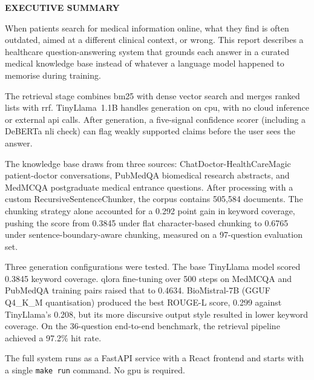 \begin{center}
	\Large{\textbf{EXECUTIVE SUMMARY}}
\end{center}
\vspace{1em}
\normalsize

When patients search for medical information online, what they find is often outdated, aimed at a different clinical context, or wrong. This report describes a healthcare question-answering system that grounds each answer in a curated medical knowledge base instead of whatever a language model happened to memorise during training.

The retrieval stage combines \ac{bm25} with dense vector search and merges ranked lists with \ac{rrf}. TinyLlama~1.1B handles generation on \ac{cpu}, with no cloud inference or external \ac{api} calls. After generation, a five-signal confidence scorer (including a DeBERTa \ac{nli} check) can flag weakly supported claims before the user sees the answer.

The knowledge base draws from three sources: ChatDoctor-HealthCareMagic patient-doctor conversations, PubMedQA biomedical research abstracts, and MedMCQA postgraduate medical entrance questions. After processing with a custom RecursiveSentenceChunker, the corpus contains 505,584 documents. The chunking strategy alone accounted for a 0.292 point gain in keyword coverage, pushing the score from 0.3845 under flat character-based chunking to 0.6765 under sentence-boundary-aware chunking, measured on a 97-question evaluation set.

Three generation configurations were tested. The base TinyLlama model scored 0.3845 keyword coverage. \ac{qlora} fine-tuning over 500 steps on MedMCQA and PubMedQA training pairs raised that to 0.4634. BioMistral-7B (GGUF Q4\_K\_M\allowbreak{} quantisation) produced the best ROUGE-L score, 0.299 against TinyLlama's 0.208, but its more discursive output style resulted in lower keyword coverage. On the 36-question end-to-end benchmark, the retrieval pipeline achieved a 97.2\% hit rate.

The full system runs as a FastAPI service with a React frontend and starts with a single \texttt{make\allowbreak{} run} command. No \ac{gpu} is required.
